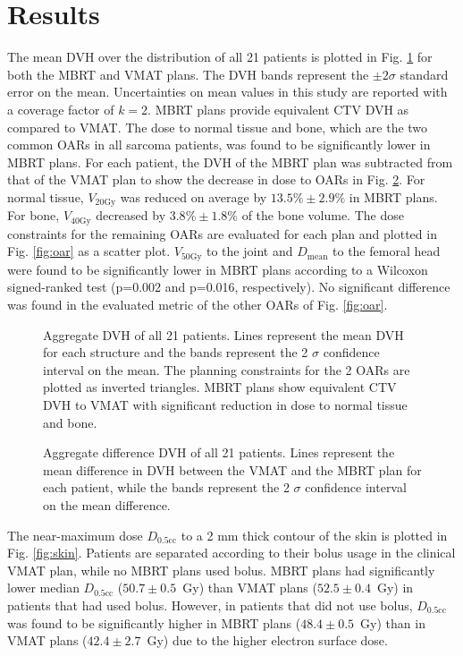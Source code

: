 \documentclass[aapm,graphicx,superscriptaddress]{revtex4-1}
\begin{document}
\section{Results}

The mean DVH over the distribution of all 21 patients is plotted in Fig. \ref{fig:dvh_average} for both the MBRT and VMAT plans. The DVH bands represent the $\pm 2 \sigma$ standard error on the mean. Uncertainties on mean values in this study are reported with a coverage factor of $k=2$. MBRT plans provide equivalent CTV DVH as compared to VMAT. The dose to normal tissue and bone, which are the two common OARs in all sarcoma patients, was found to be significantly lower in MBRT plans. For each patient, the DVH of the MBRT plan was subtracted from that of the VMAT plan to show the decrease in dose to OARs in Fig. \ref{fig:dvh_difference_average}. For normal tissue, $V_\text{20Gy}$ was reduced on average by $13.5\%\pm2.9\%$ in MBRT plans. For bone, $V_\text{40Gy}$ decreased by $3.8\%\pm1.8\%$ of the bone volume. The dose constraints for the remaining OARs are evaluated for each plan and plotted in Fig. \ref{fig:oar} as a scatter plot. $V_\text{50Gy}$ to the joint and $D_\text{mean}$ to the femoral head were found to be significantly lower in MBRT plans according to a Wilcoxon signed-ranked test (p=0.002 and p=0.016, respectively). No significant difference was found in the evaluated metric of the other OARs of Fig. \ref{fig:oar}.\\

\begin{figure}[htb]
    \centering
    
    \caption{Aggregate DVH of all 21 patients. Lines represent the mean DVH for each structure and the bands represent the 2 $\sigma$ confidence interval on the mean. The planning constraints for the 2 OARs are plotted as inverted triangles. MBRT plans show equivalent CTV DVH to VMAT with significant reduction in dose to normal tissue and bone.}
    \label{fig:dvh_average}
\end{figure}
\begin{figure}[htb]
    \centering
    
    \caption{Aggregate difference DVH of all 21 patients. Lines represent the mean difference in DVH between the VMAT and the MBRT plan for each patient, while the bands represent the 2 $\sigma$ confidence interval on the mean difference.}
    \label{fig:dvh_difference_average}
\end{figure}
The near-maximum dose $D_\text{0.5cc}$ to a 2 mm thick contour of the skin is plotted in Fig. \ref{fig:skin}. Patients are separated according to their bolus usage in the clinical VMAT plan, while no MBRT plans used bolus. MBRT plans had significantly lower median $D_\text{0.5cc}$ ($50.7\pm0.5$~Gy) than VMAT plans ($52.5\pm0.4$~Gy) in patients that had used bolus. However, in patients that did not use bolus, $D_\text{0.5cc}$ was found to be significantly higher in MBRT plans ($48.4\pm0.5$~Gy) than in VMAT plans ($42.4\pm2.7$~Gy) due to the higher electron surface dose.\\
\end{document}
